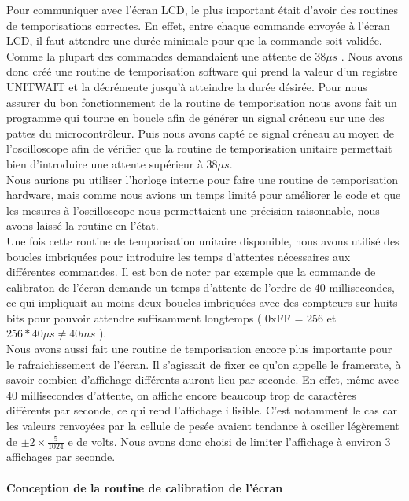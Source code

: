 \documentclass[a4paper,11pt,titlepage]{article}
\begin{document}
Pour communiquer avec l'écran LCD, le plus important était d'avoir des routines de temporisations correctes. En effet, entre chaque commande envoyée à l'écran LCD, il faut attendre une durée minimale pour que la commande soit validée. Comme la plupart des commandes demandaient une attente de $ 38 \mu s $ . Nous avons donc créé une routine de temporisation software qui prend la valeur d'un registre UNIT\textunderscore WAIT et la décrémente jusqu'à atteindre la durée désirée. Pour nous assurer du bon fonctionnement de la routine de temporisation nous avons fait un programme qui tourne en boucle afin de générer un signal créneau sur une des pattes du microcontrôleur. Puis nous avons capté ce signal créneau au moyen de l'oscilloscope afin de vérifier que la routine de temporisation unitaire permettait bien d'introduire une attente supérieur à $ 38 \mu s $.\\

Nous aurions pu utiliser l'horloge interne pour faire une routine de temporisation hardware, mais comme nous avions un temps limité pour améliorer le code et que les mesures à l'oscilloscope nous permettaient une précision raisonnable, nous avons laissé la routine en l'état.\\

Une fois cette routine de temporisation unitaire disponible, nous avons utilisé des boucles imbriquées pour introduire les temps d'attentes nécessaires aux différentes commandes. Il est bon de noter par exemple que la commande de calibraton de l'écran demande un temps d'attente de l'ordre de 40 millisecondes, ce qui impliquait au moins deux boucles imbriquées avec des compteurs sur huits bits pour pouvoir attendre suffisamment longtemps ( 0xFF = 256 et $256 * 40 \mu s  \neq 40 ms$ ).\\

Nous avons aussi fait une routine de temporisation encore plus importante pour le rafraichissement de l'écran. Il s'agissait de fixer ce qu'on appelle le framerate, à savoir combien d'affichage différents auront lieu par seconde. En effet, même avec 40 millisecondes d'attente, on affiche encore beaucoup trop de caractères différents par seconde, ce qui rend l'affichage illisible. C'est notamment le cas car les valeurs renvoyées par la cellule de pesée avaient tendance à osciller légèrement de $\pm 2 \times \frac{5}{1024}$ e de volts. Nous avons donc choisi de limiter l'affichage à environ 3 affichages par seconde.\\

\paragraph{Conception de la routine de calibration de l'écran}
\end{document}
